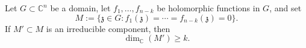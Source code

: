 Let $G \subset \mathbb{C}^n$ be a domain, let $f_1, \ldots, f_{n-k}$ be holomorphic functions in $G$, and set
$$M := \{ \mathfrak{z} \in G : f_1(\mathfrak{z}) = \cdots = f_{n-k}(\mathfrak{z}) = 0 \}.$$
If $M' \subset M$ is an irreducible component, then
$$\dim_{\mathbb{C}}(M') \geq k.$$
